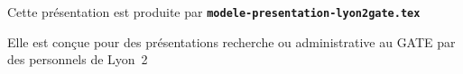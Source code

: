   \item Cette présentation est produite par \texttt{\textbf{modele-presentation-lyon2gate.tex}}
  \item Elle est conçue pour des présentations recherche ou administrative au GATE par des personnels de Lyon~2
